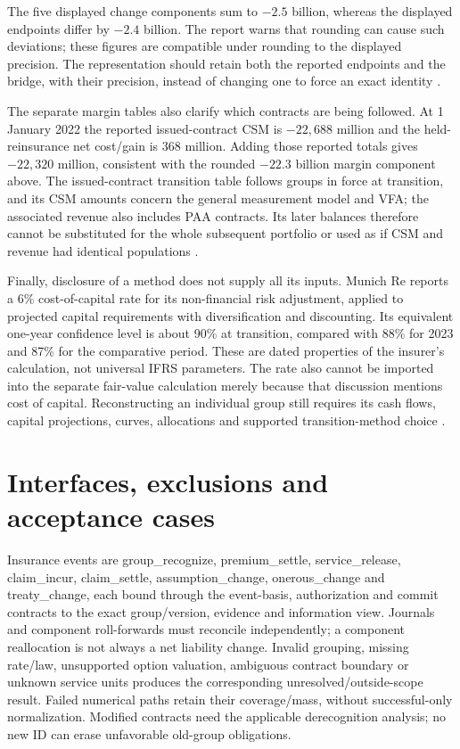 The five displayed change components sum to $-2.5$ billion, whereas the
displayed endpoints differ by $-2.4$ billion. The report warns that rounding
can cause such deviations; these figures are compatible under rounding to
the displayed precision. The representation should retain both the reported
endpoints and the bridge, with their precision, instead of changing one to
force an exact identity \citep[pp.~1, 155 and 184]{munichre2023annual}.

\clearpage
The separate margin tables also clarify which contracts are being followed.
At 1 January 2022 the reported issued-contract CSM is $-22{,}688$ million
and the held-reinsurance net cost/gain is $368$ million. Adding those reported
totals gives $-22{,}320$ million, consistent with the rounded $-22.3$ billion
margin component above. The issued-contract transition table follows groups
in force at transition, and its CSM amounts concern the general measurement
model and VFA; the associated revenue also includes PAA contracts. Its
later balances therefore cannot be substituted for the whole subsequent
portfolio or used as if CSM and revenue had identical populations
\citep[pp.~210--211 and 254--255]{munichre2023annual}.

Finally, disclosure of a method does not supply all its inputs. Munich Re
reports a 6\% cost-of-capital rate for its non-financial risk adjustment,
applied to projected capital requirements with diversification and discounting.
Its equivalent one-year confidence level is about 90\% at transition, compared
with 88\% for 2023 and 87\% for the comparative period. These are dated
properties of the insurer's calculation, not universal IFRS parameters.
The rate also cannot be imported into the separate fair-value calculation
merely because that discussion mentions cost of capital. Reconstructing an
individual group still requires its cash flows, capital projections, curves,
allocations and supported transition-method choice
\citep[pp.~165, 183 and 185]{munichre2023annual}.

\clearpage
\hypertarget{interfaces-exclusions-and-acceptance-cases}{%
\section{Interfaces, exclusions and acceptance cases}\label{method-insurance-methods-interfaces-exclusions-and-acceptance-cases}}

Insurance events are group\_recognize, premium\_settle, service\_release, claim\_incur, claim\_settle, assumption\_change, onerous\_change and treaty\_change, each bound through the event-basis, authorization and commit contracts to the exact group/version, evidence and information view. Journals and component roll-forwards must reconcile independently; a component reallocation is not always a net liability change. Invalid grouping, missing rate/law, unsupported option valuation, ambiguous contract boundary or unknown service units produces the corresponding unresolved/outside-scope result. Failed numerical paths retain their coverage/mass, without successful-only normalization. Modified contracts need the applicable derecognition analysis; no new ID can erase unfavorable old-group obligations.

